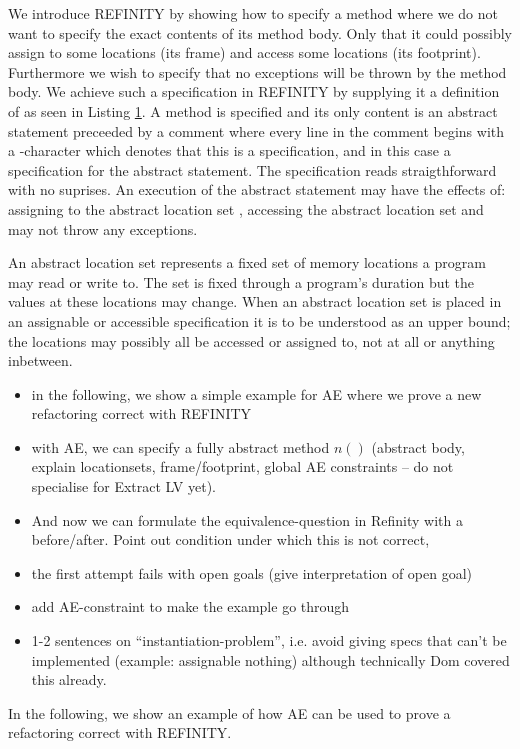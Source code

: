 We introduce REFINITY by showing how to specify a method  where we do not want to specify the exact contents of its method body.
Only that it could possibly assign to some locations (its frame) and access some locations (its footprint).
Furthermore we wish to specify that no exceptions will be thrown by the method body.
We achieve such a specification in REFINITY by supplying it a definition of  as seen in Listing \ref{lst:ExtractVariable-refinity-method}.
A method is specified and its only content is an abstract statement  preceeded by a comment where every line in the
comment begins with a -character which denotes that this is a specification, and in this case a specification for the abstract statement.
The specification reads straigthforward with no suprises. An execution of the abstract statement  may have the effects of: assigning to the
abstract location set , accessing the abstract location set  and may not throw any exceptions.

An abstract location set represents a fixed set of memory locations a program may read or write to.
The set is fixed through a program's duration but the values at these locations may change.
When an abstract location set is placed in an assignable or accessible specification it is to be understood as an upper bound;
the locations may possibly all be accessed or assigned to, not at all or anything inbetween.


\begin{figure}[h]
  \centering
  \begin{minipage}{.65\linewidth}
  
  \label{lst:ExtractVariable-refinity-method}
  \end{minipage}
\end{figure}


\begin{itemize}
\item in the following, we show a simple example for AE where we prove a new refactoring correct with REFINITY
\item with AE, we can specify a fully abstract method $n()$ (abstract body, explain locationsets, frame/footprint, global AE constraints -- do not specialise for Extract LV yet).
\item And now we can formulate the equivalence-question in Refinity with a before/after. Point out condition under which this is not correct,
\item the first attempt fails with open goals (give interpretation of open goal)
\item add AE-constraint to make the example go through
\item 1-2 sentences on ``instantiation-problem'', i.e. avoid giving specs that can't be implemented (example: assignable nothing) although technically Dom covered this already.
\end{itemize}

In the following, we show an example of how AE can be used to prove a refactoring correct with REFINITY. 


